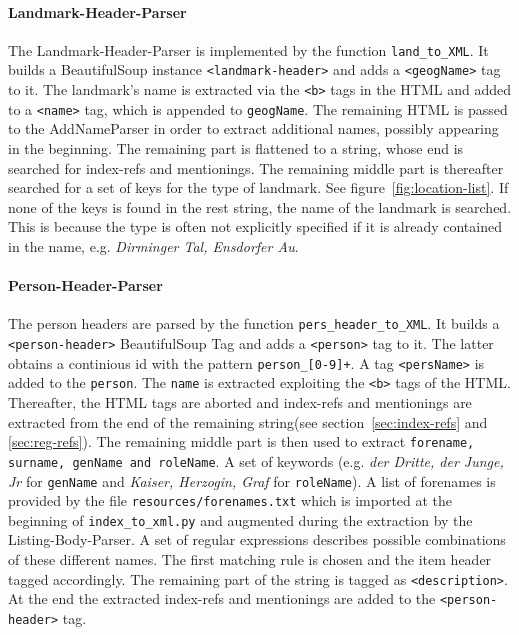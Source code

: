 \paragraph{Landmark-Header-Parser}
The Landmark-Header-Parser is implemented by the function \texttt{land\_to\_XML}. It builds a BeautifulSoup instance \texttt{<landmark-header>} and adds a \texttt{<geogName>} tag to it. The landmark's name is extracted via the \texttt{<b>} tags in the HTML and added to a \texttt{<name>} tag, which is appended to \texttt{geogName}. The remaining HTML is passed to the AddNameParser in order to extract additional names, possibly appearing in the beginning. The remaining part is flattened to a string, whose end is searched for index-refs and mentionings. The remaining middle part is thereafter searched for a set of keys for the type of landmark. See figure~\ref{fig:location-list}. If none of the keys is found in the rest string, the name of the landmark is searched. This is because the type is often not explicitly specified if it is already contained in the name, e.g. \textit{Dirminger Tal, Ensdorfer Au}.

\paragraph{Person-Header-Parser}
The person headers are parsed by the function \texttt{pers\_header\_to\_XML}. It builds a \texttt{<person-header>} BeautifulSoup Tag and adds a \texttt{<person>} tag to it. The latter obtains a continious id with the pattern \texttt{person\_[0-9]+}. A tag \texttt{<persName>} is added to the \texttt{person}. The \texttt{name} is extracted exploiting the \texttt{<b>} tags of the HTML. Thereafter, the HTML tags are aborted and index-refs and mentionings are extracted from the end of the remaining string(see section~\ref{sec:index-refs} and \ref{sec:reg-refs}). The remaining middle part is then used to extract \texttt{forename, surname, genName and roleName}. A set of keywords (e.g. \textit{der Dritte, der Junge, Jr} for \texttt{genName} and \textit{Kaiser, Herzogin, Graf} for \texttt{roleName}). A list of forenames is provided by the file \texttt{resources/forenames.txt} which is imported at the beginning of \texttt{index\_to\_xml.py} and augmented during the extraction by the Listing-Body-Parser. A set of regular expressions describes possible combinations of these different names. The first matching rule is chosen and the item header tagged accordingly. The remaining part of the string is tagged as \texttt{<description>}. At the end the extracted index-refs and mentionings are added to the \texttt{<person-header>} tag.

